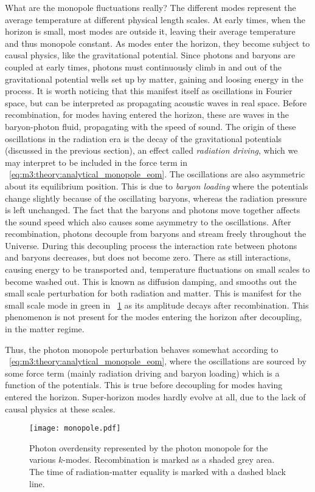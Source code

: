     What are the monopole fluctuations really? The different modes represent the average temperature at different physical length scales. At early times, when the horizon is small, most modes are outside it, leaving their average temperature and thus monopole constant. As modes enter the horizon, they become subject to causal physics, like the gravitational potential. Since photons and baryons are coupled at early times, photons must continuously climb in and out of the gravitational potential wells set up by matter, gaining and loosing energy in the process. It is worth noticing that this manifest itself as oscillations in Fourier space, but can be interpreted as propagating acoustic waves in real space. Before recombination, for modes having entered the horizon, these are waves in the baryon-photon fluid, propagating with the speed of sound. The origin of these oscillations in the radiation era is the decay of the gravitational potentials (discussed in the previous section), an effect called \textit{radiation driving}, which we may interpret to be included in the force term in ~\cref{eq:m3:theory:analytical_monopole_eom}. The oscillations are also asymmetric about its equilibrium position. This is due to \textit{baryon loading} where the potentials change slightly because of the oscillating baryons, whereas the radiation pressure is left unchanged. The fact that the baryons and photons move together affects the sound speed which also causes some asymmetry to the oscillations. After recombination, photons decouple from baryons and stream freely throughout the Universe. During this decoupling process the interaction rate between photons and baryons decreases, but does not become zero. There as still interactions, causing energy to be transported and, temperature fluctuations on small scales to become washed out. This is known as diffusion damping, and smooths out the small scale perturbation for both radiation and matter. This is manifest for the small scale mode in green in ~\cref{fig:m3:monopole} as its amplitude decays after recombination. This phenomenon is not present for the modes entering the horizon after decoupling, in the matter regime. 

    Thus, the photon monopole perturbation behaves somewhat according to ~\cref{eq:m3:theory:analytical_monopole_eom}, where the oscillations are sourced by some force term (mainly radiation driving and baryon loading) which is a function of the potentials. This is true before decoupling for modes having entered the horizon. Super-horizon modes hardly evolve at all, due to the lack of causal physics at these scales.
    \begin{figure}
        \texttt{[image: monopole.pdf]}
        \caption{Photon overdensity represented by the photon monopole for the various $k$-modes. Recombination is marked as a shaded grey area. The time of radiation-matter equality is marked with a dashed black line.}
        \label{fig:m3:monopole}
    \end{figure}

